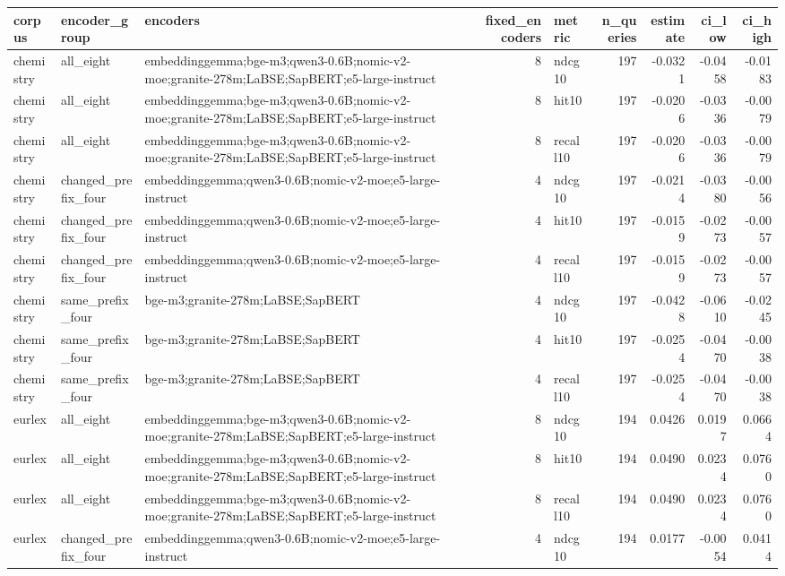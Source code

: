 \begin{tabular}{lllrlrrrr}
\toprule
corpus & encoder\_group & encoders & fixed\_encoders & metric & n\_queries & estimate & ci\_low & ci\_high \\
\midrule
chemistry & all\_eight & embeddinggemma;bge-m3;qwen3-0.6B;nomic-v2-moe;granite-278m;LaBSE;SapBERT;e5-large-instruct & 8 & ndcg10 & 197 & -0.0321 & -0.0458 & -0.0183 \\
chemistry & all\_eight & embeddinggemma;bge-m3;qwen3-0.6B;nomic-v2-moe;granite-278m;LaBSE;SapBERT;e5-large-instruct & 8 & hit10 & 197 & -0.0206 & -0.0336 & -0.0079 \\
chemistry & all\_eight & embeddinggemma;bge-m3;qwen3-0.6B;nomic-v2-moe;granite-278m;LaBSE;SapBERT;e5-large-instruct & 8 & recall10 & 197 & -0.0206 & -0.0336 & -0.0079 \\
chemistry & changed\_prefix\_four & embeddinggemma;qwen3-0.6B;nomic-v2-moe;e5-large-instruct & 4 & ndcg10 & 197 & -0.0214 & -0.0380 & -0.0056 \\
chemistry & changed\_prefix\_four & embeddinggemma;qwen3-0.6B;nomic-v2-moe;e5-large-instruct & 4 & hit10 & 197 & -0.0159 & -0.0273 & -0.0057 \\
chemistry & changed\_prefix\_four & embeddinggemma;qwen3-0.6B;nomic-v2-moe;e5-large-instruct & 4 & recall10 & 197 & -0.0159 & -0.0273 & -0.0057 \\
chemistry & same\_prefix\_four & bge-m3;granite-278m;LaBSE;SapBERT & 4 & ndcg10 & 197 & -0.0428 & -0.0610 & -0.0245 \\
chemistry & same\_prefix\_four & bge-m3;granite-278m;LaBSE;SapBERT & 4 & hit10 & 197 & -0.0254 & -0.0470 & -0.0038 \\
chemistry & same\_prefix\_four & bge-m3;granite-278m;LaBSE;SapBERT & 4 & recall10 & 197 & -0.0254 & -0.0470 & -0.0038 \\
eurlex & all\_eight & embeddinggemma;bge-m3;qwen3-0.6B;nomic-v2-moe;granite-278m;LaBSE;SapBERT;e5-large-instruct & 8 & ndcg10 & 194 & 0.0426 & 0.0197 & 0.0664 \\
eurlex & all\_eight & embeddinggemma;bge-m3;qwen3-0.6B;nomic-v2-moe;granite-278m;LaBSE;SapBERT;e5-large-instruct & 8 & hit10 & 194 & 0.0490 & 0.0234 & 0.0760 \\
eurlex & all\_eight & embeddinggemma;bge-m3;qwen3-0.6B;nomic-v2-moe;granite-278m;LaBSE;SapBERT;e5-large-instruct & 8 & recall10 & 194 & 0.0490 & 0.0234 & 0.0760 \\
eurlex & changed\_prefix\_four & embeddinggemma;qwen3-0.6B;nomic-v2-moe;e5-large-instruct & 4 & ndcg10 & 194 & 0.0177 & -0.0054 & 0.0414 \\

\end{tabular}
